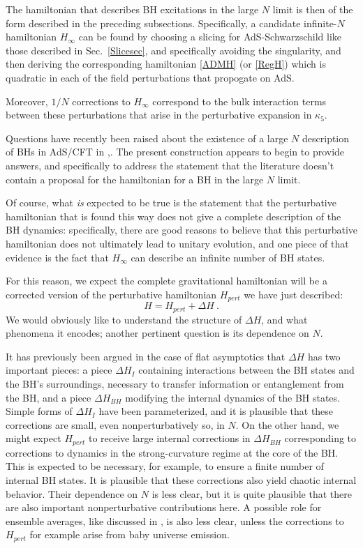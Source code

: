 \documentclass[12pt]{article}
\numberwithin{equation}{section}
\newcommand{\beq}{\begin{equation}}
\newcommand{\eeq}{\end{equation}}
\begin{document}
The hamiltonian that describes BH excitations in the large $N$ limit is then of the form described in the preceding subsections.  Specifically, a candidate infinite-$N$ hamiltonian $H_\infty$ can be found by choosing a slicing for AdS-Schwarzschild like those described in Sec.~\ref{Slicesec}, and specifically avoiding the singularity, and then deriving the corresponding  hamiltonian \eqref{ADMH} (or \eqref{RegH}) which is quadratic in each of the field perturbations that propogate on AdS.  

Moreover, $1/N$ corrections to $H_\infty$ correspond to the bulk interaction terms between these perturbations that arise in the perturbative expansion in $\kappa_5$. 

Questions have recently been raised about the existence of a large $N$ description of BHs in AdS/CFT in \cite{WittQFT,Wittcross},\cite{ScWi}.  The present construction appears to begin to provide answers, and specifically to address the statement\cite{ScWi} that the literature doesn't contain a proposal for the hamiltonian for a BH in the large $N$ limit.

Of course, what {\it is} expected to be true is the statement that the perturbative hamiltonian that is found this way does not give a complete description of the BH dynamics:  specifically, there are good reasons to believe that this perturbative hamiltonian does not ultimately lead to unitary evolution, and one piece of that evidence is the fact that $H_\infty$ can describe an infinite number of BH states.  

For this reason, we expect the complete gravitational hamiltonian will be a corrected version of the perturbative hamiltonian $H_{pert}$ we have just described:
\beq
H = H_{pert} + \Delta H\ .
\eeq
We would obviously like to understand the structure of $\Delta H$, and what phenomena it encodes; another pertinent question is its dependence on $N$.

It has previously been argued\cite{NVNL,NVNLT,NVU,BHQU} in the case of flat asymptotics that $\Delta H$ has two important pieces: a piece $\Delta H_I$ containing interactions between the BH states and the BH's surroundings, necessary to transfer information or entanglement from the BH, and a piece $\Delta H_{BH}$ modifying the internal dynamics of the BH states.  Simple forms of $\Delta H_I$ have been parameterized\cite{NVU}, and it is plausible that these corrections are small, even nonperturbatively so, in $N$.  On the other hand, we might expect $H_{pert}$ to receive large internal corrections in $\Delta H_{BH}$  corresponding to corrections to dynamics in the strong-curvature regime at the core of the BH.  
This is expected to be necessary, for example, to ensure a finite number of internal BH states.
It is plausible that these corrections also yield chaotic internal behavior.  Their dependence on $N$ is less clear, but it is quite plausible that there are also important nonperturbative contributions here.  A possible role for ensemble averages, like discussed in \cite{ScWi}, is also less clear, unless the corrections to $H_{pert}$ for example arise from baby universe emission\cite{Cole,GiSt,MaMa,GiTu,SGthm,HTY}.
\end{document}
